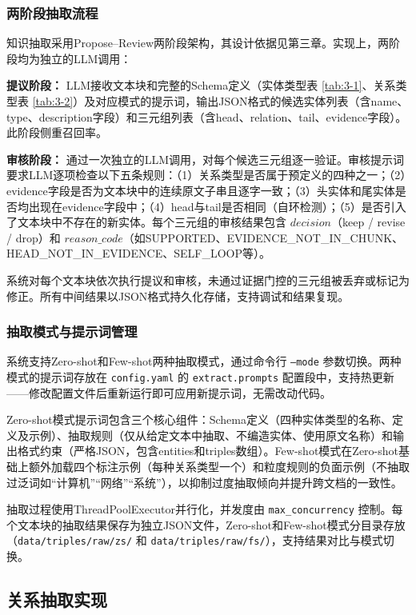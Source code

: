 \subsubsection{两阶段抽取流程}

知识抽取采用Propose--Review两阶段架构，其设计依据见第三章。实现上，两阶段均为独立的LLM调用：

\textbf{提议阶段：} LLM接收文本块和完整的Schema定义（实体类型表 \ref{tab:3-1}、关系类型表 \ref{tab:3-2}）及对应模式的提示词，输出JSON格式的候选实体列表（含name、type、description字段）和三元组列表（含head、relation、tail、evidence字段）。此阶段侧重召回率。

\textbf{审核阶段：} 通过一次独立的LLM调用，对每个候选三元组逐一验证。审核提示词要求LLM逐项检查以下五条规则：（1）关系类型是否属于预定义的四种之一；（2）evidence字段是否为文本块中的连续原文子串且逐字一致；（3）头实体和尾实体是否均出现在evidence字段中；（4）head与tail是否相同（自环检测）；（5）是否引入了文本块中不存在的新实体。每个三元组的审核结果包含 $decision$（keep / revise / drop）和 $reason\_code$（如SUPPORTED、EVIDENCE\_NOT\_IN\_CHUNK、HEAD\_NOT\_IN\_EVIDENCE、SELF\_LOOP等）。

系统对每个文本块依次执行提议和审核，未通过证据门控的三元组被丢弃或标记为修正。所有中间结果以JSON格式持久化存储，支持调试和结果复现。

\subsubsection{抽取模式与提示词管理}

系统支持Zero-shot和Few-shot两种抽取模式，通过命令行 \texttt{--mode} 参数切换。两种模式的提示词存放在 \texttt{config.yaml} 的 \texttt{extract.prompts} 配置段中，支持热更新——修改配置文件后重新运行即可应用新提示词，无需改动代码。

Zero-shot模式提示词包含三个核心组件：Schema定义（四种实体类型的名称、定义及示例）、抽取规则（仅从给定文本中抽取、不编造实体、使用原文名称）和输出格式约束（严格JSON，包含entities和triples数组）。Few-shot模式在Zero-shot基础上额外加载四个标注示例（每种关系类型一个）和粒度规则的负面示例（不抽取过泛词如“计算机”“网络”“系统”），以抑制过度抽取倾向并提升跨文档的一致性。

抽取过程使用ThreadPoolExecutor并行化，并发度由 \texttt{max\_concurrency} 控制。每个文本块的抽取结果保存为独立JSON文件，Zero-shot和Few-shot模式分目录存放（\texttt{data/triples/raw/zs/} 和 \texttt{data/triples/raw/fs/}），支持结果对比与模式切换。

\subsection{关系抽取实现}

